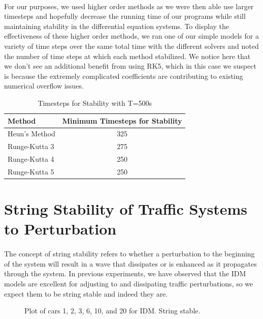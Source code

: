 \documentclass[12pt]{article}
\begin{document}
\paragraph{}For our purposes, we used higher order methods as we were then able use larger timesteps and hopefully decrease the running time of our programs while still maintaining stability in the differential equation systems. To display the effectiveness of these higher order methods, we ran one of our simple models for a variety of time steps over the same total time with the different solvers and noted the number of time steps at which each method stabilized. We notice here that we don't see an additional benefit from using RK5, which in this case we suspect is because the extremely complicated coefficients are contributing to existing numerical overflow issues.\\
\begin{table}[H]
\centering
\caption{Timesteps for Stability with T=500s}
\label{my-label}
\begin{tabular}{lc}
 Method &  Minimum Timesteps for Stability\\ \hline
 Heun's Method & 325 \\
 Runge-Kutta 3 &  275\\
 Runge-Kutta 4 &  250\\
 Runge-Kutta 5 & 250
\end{tabular}
\end{table}

\section{String Stability of Traffic Systems to Perturbation}

\paragraph{}The concept of string stability refers to whether a perturbation to the beginning of the system will result in a wave that dissipates or is enhanced as it propagates through the system. In previous experiments, we have observed that the IDM models are excellent for adjusting to and dissipating traffic perturbations, so we expect them to be string stable and indeed they are.

\begin{figure}[H]
  \centering
  \caption{Plot of cars 1, 2, 3, 6, 10, and 20 for IDM. String stable.}
\end{figure}
\end{document}
